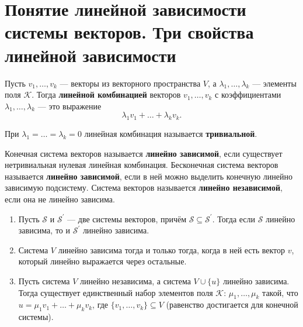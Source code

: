 \section{Понятие линейной зависимости системы векторов. Три свойства линейной зависимости}

\begin{definition}
    Пусть $v_1, \ldots, v_k$ --- векторы из векторного пространства $V$, а $\lambda_1, \ldots, \lambda_k$ --- элементы поля $\mathcal{K}$. Тогда \textbf{линейной комбинацией} векторов $v_1, \ldots, v_k$ с коэффициентами $\lambda_1, \ldots, \lambda_k$ --- это выражение
    $$
    \lambda_1v_1 + \ldots + \lambda_kv_k.
    $$

    При $\lambda_1 = \ldots = \lambda_k = 0$ линейная комбинация называется \textbf{тривиальной}.
\end{definition}

\begin{definition}
    Конечная система векторов называется \textbf{линейно зависимой}, если существует нетривиальная нулевая линейная комбинация. Бесконечная система векторов называется \textbf{линейно зависимой}, если в ней можно выделить конечную линейно зависимую подсистему. Система векторов называется \textbf{линейно независимой}, если она не линейно зависима.
\end{definition}

\begin{theorem}
    \begin{enumerate}
        \item Пусть $\mathcal{S}$ и $\mathcal{S}^\prime$ --- две системы векторов, причём $\mathcal{S} \subseteq \mathcal{S}^\prime$. Тогда если $\mathcal{S}$ линейно зависима, то и $\mathcal{S}^\prime$ линейно зависима.
        \item Система $V$ линейно зависима тогда и только тогда, когда в ней есть вектор $v$, который линейно выражается через остальные.
        \item Пусть система $V$ линейно независима, а система $V \cup \{u\}$ линейно зависима. Тогда существует единственный набор элементов поля $\mathcal{K}$: $\mu_1, \ldots, \mu_k$ такой, что $u = \mu_1v_1 + \ldots + \mu_kv_k$, где $\{v_1, \ldots, v_k\} \subseteq V$ (равенство достигается для конечной системы).
    \end{enumerate}
\end{theorem}

